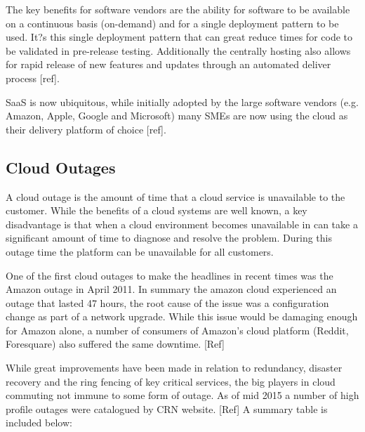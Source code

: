 \documentclass[conference]{IEEEtran}
\begin{document}
The key benefits for software vendors are the ability for software to be available on a continuous basis (on-demand) and for a single deployment pattern to be used. It?s this single deployment pattern that can great reduce times for code to be validated in pre-release testing. Additionally the centrally hosting also allows for rapid release of new features and updates through an automated deliver process [ref]. \par
SaaS is now ubiquitous, while initially adopted by the large software vendors (e.g. Amazon, Apple, Google and Microsoft) many SMEs are now using the cloud as their delivery platform of choice [ref]. \par

\subsection{Cloud Outages}
A cloud outage is the amount of time that a cloud service is unavailable to the customer. While the benefits of a cloud systems are well known, a key disadvantage is that when a cloud environment becomes unavailable in can take a significant amount of time to diagnose and resolve the problem. During this outage time the platform can be unavailable for all customers. \par

One of the first cloud outages to make the headlines in recent times was the Amazon outage in April 2011.  In summary the amazon cloud experienced an outage that lasted 47 hours, the root cause of the issue was a configuration change as part of a network upgrade. While this issue would be damaging enough for Amazon alone, a number of consumers of Amazon's cloud platform (Reddit, Foresquare) also suffered the same downtime. [Ref] \par

While great improvements have been made in relation to redundancy, disaster recovery and the ring fencing of key critical services, the big players in cloud commuting not immune to some form of outage. As of mid 2015 a number of high profile outages were catalogued by CRN website. [Ref] A summary table is included below: \par
\end{document}
